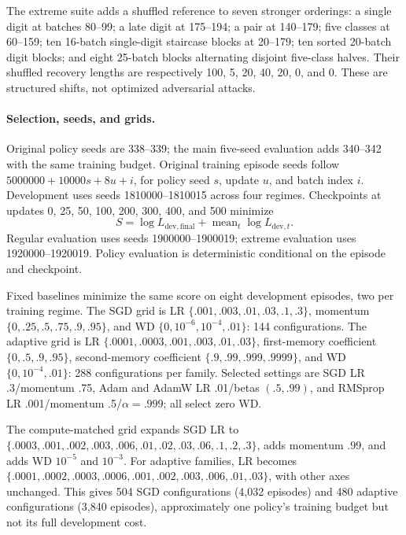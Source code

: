\documentclass{article}
\begin{document}
The extreme suite adds a shuffled reference to seven stronger orderings: a single digit at batches 80--99; a late digit at 175--194; a pair at 140--179; five classes at 60--159; ten 16-batch single-digit staircase blocks at 20--179; ten sorted 20-batch digit blocks; and eight 25-batch blocks alternating disjoint five-class halves. Their shuffled recovery lengths are respectively 100, 5, 20, 40, 20, 0, and 0. These are structured shifts, not optimized adversarial attacks.

\paragraph{Selection, seeds, and grids.}
Original policy seeds are 338--339; the main five-seed evaluation adds 340--342 with the same training budget. Original training episode seeds follow $5000000+10000s+8u+i$, for policy seed $s$, update $u$, and batch index $i$. Development uses seeds 1810000--1810015 across four regimes. Checkpoints at updates 0, 25, 50, 100, 200, 300, 400, and 500 minimize
\begin{equation}
 S=\log L_{\mathrm{dev,final}}+\operatorname{mean}_t\log L_{\mathrm{dev},t}.
\end{equation}
Regular evaluation uses seeds 1900000--1900019; extreme evaluation uses 1920000--1920019. Policy evaluation is deterministic conditional on the episode and checkpoint.

Fixed baselines minimize the same score on eight development episodes, two per training regime. The SGD grid is LR $\{.001,.003,.01,.03,.1,.3\}$, momentum $\{0,.25,.5,.75,.9,.95\}$, and WD $\{0,10^{-6},10^{-4},.01\}$: 144 configurations. The adaptive grid is LR $\{.0001,.0003,.001,.003,.01,.03\}$, first-memory coefficient $\{0,.5,.9,.95\}$, second-memory coefficient $\{.9,.99,.999,.9999\}$, and WD $\{0,10^{-4},.01\}$: 288 configurations per family. Selected settings are SGD LR .3/momentum .75, Adam and AdamW LR .01/betas $(.5,.99)$, and RMSprop LR .001/momentum .5/$\alpha=.999$; all select zero WD.

The compute-matched grid expands SGD LR to $\{.0003,\allowbreak .001,\allowbreak .002,\allowbreak .003,\allowbreak .006,\allowbreak .01,\allowbreak .02,\allowbreak .03,\allowbreak .06,\allowbreak .1,\allowbreak .2,\allowbreak .3\}$, adds momentum .99, and adds WD $10^{-5}$ and $10^{-3}$. For adaptive families, LR becomes $\{.0001,\allowbreak .0002,\allowbreak .0003,\allowbreak .0006,\allowbreak .001,\allowbreak .002,\allowbreak .003,\allowbreak .006,\allowbreak .01,\allowbreak .03\}$, with other axes unchanged. This gives 504 SGD configurations (4,032 episodes) and 480 adaptive configurations (3,840 episodes), approximately one policy's training budget but not its full development cost.
\end{document}
